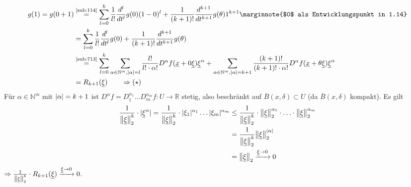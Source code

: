 \begin{align*}
	g(1) = g(0+1) &\stackrel{\text{\ref{sub:114}}}{=} \sum_{l=0}^{k} \frac{1}{l!} \frac{d^l}{d t^l} g(0) (1-0)^l + \frac{1}{(k+1)!} \frac{d^{k+1}}{d t^{k+1}} g(\theta) 1^{k+1} \marginnote{$0$ als Entwicklungspunkt in 1.14} \\
	&= \sum_{l=0}^{k}  \frac{1}{l!} \frac{d^l}{d t^l} g(0) + \frac{1}{(k+1)!} \frac{d^{k+1}}{d t^{k+1}} g(\theta)   \\
	&\stackrel{\text{\ref{sub:713}}}{=} \sum_{l=0}^{k} \sum_{\alpha \in \mathds{N}^m, \abs{\alpha}=l } \frac{l!}{ l! \cdot \alpha !} D^\alpha f( \underline{x} + 0 
	\underline{\xi}) \underline{\xi}^\alpha   + \sum_{\alpha \in \mathds{N}^m, \abs{\alpha} = k+1 } \frac{(k+1)!}{(k+1)! \cdot \alpha!}  D^\alpha f 
	(\underline{x} + \theta \underline{\xi}) \underline{\xi}^\alpha \\
	&= R_{k+1}(\underline{\xi}) \qquad \Rightarrow (\star)
\end{align*}
Für $\alpha \in \mathds{N}^m$ mit $\lvert\alpha\rvert = k+1 $ ist $D^\alpha f =  D_1^{\alpha_1} \ldots  D_m^{\alpha_m} f : U \to \mathds{R}$ stetig, also beschränkt auf 
$\overline{B} (x, \delta) \subset U $ (da $\overline{B}(x, \delta ) $ kompakt). Es gilt
\begin{align*}
	\frac{1}{\norm[2]{\underline{\xi}}^k } \cdot \abs{\underline{\xi}^\alpha} = \frac{1}{\norm[2]{\underline{\xi}}^k } \cdot \abs{\xi_1}^{\alpha_1} \ldots \abs{\xi_m}^{\alpha_m} &\le \frac{1}{\norm[2]{\underline{\xi}}^k } \cdot \norm[2]{\underline{\xi}}^{\alpha_1} \cdot \ldots \cdot \norm[2]{\underline{\xi}}^{\alpha_m}\\
	&= \frac{1}{\norm[2]{\underline{\xi}}^k } \norm[2]{\underline{\xi}}^{\abs{\alpha} } \\
	&= \norm[2]{\underline{\xi}}  \xrightarrow{\underline{\xi} \to 0} 0
\end{align*}
$\Rightarrow \frac{1}{\norm[2]{\underline{\xi}}^k } \cdot R_{k+1} (\underline{\xi}) \xrightarrow{\underline{\xi} \to 0} 0 $. \bewende

